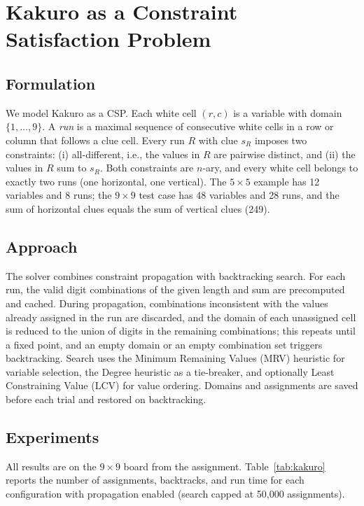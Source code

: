 
\section{Kakuro as a Constraint Satisfaction Problem}

\subsection{Formulation}
We model Kakuro as a CSP. Each white cell $(r,c)$ is a variable with domain $\{1,\dots,9\}$. A \emph{run} is a maximal sequence of consecutive white cells in a row or column that follows a clue cell. Every run $R$ with clue $s_R$ imposes two constraints: (i) all-different, i.e., the values in $R$ are pairwise distinct, and (ii) the values in $R$ sum to $s_R$. Both constraints are $n$-ary, and every white cell belongs to exactly two runs (one horizontal, one vertical). The $5\times5$ example has 12 variables and 8 runs; the $9\times9$ test case has 48 variables and 28 runs, and the sum of horizontal clues equals the sum of vertical clues (249).

\subsection{Approach}
The solver combines constraint propagation with backtracking search. For each run, the valid digit combinations of the given length and sum are precomputed and cached. During propagation, combinations inconsistent with the values already assigned in the run are discarded, and the domain of each unassigned cell is reduced to the union of digits in the remaining combinations; this repeats until a fixed point, and an empty domain or an empty combination set triggers backtracking. Search uses the Minimum Remaining Values (MRV) heuristic for variable selection, the Degree heuristic as a tie-breaker, and optionally Least Constraining Value (LCV) for value ordering. Domains and assignments are saved before each trial and restored on backtracking.

\subsection{Experiments}
All results are on the $9\times9$ board from the assignment. Table~\ref{tab:kakuro} reports the number of assignments, backtracks, and run time for each configuration with propagation enabled (search capped at 50{,}000 assignments).

